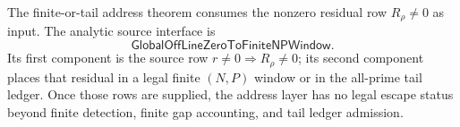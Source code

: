 \begin{principle}
\label{prin:rh-offline-zero-finite-or-tail-address-audit-boundary}
The finite-or-tail address theorem consumes the nonzero residual row
$R_\rho\ne0$ as input.  The analytic source interface is
$$
\mathsf{GlobalOffLineZeroToFiniteNPWindow}.
$$
Its first component is the source row
$r\ne0\Longrightarrow R_\rho\ne0$; its second component places that
residual in a legal finite $(N,P)$ window or in the all-prime tail
ledger.  Once those rows are supplied, the address layer has no legal
escape status beyond finite detection, finite gap accounting, and tail
ledger admission.
\end{principle}
